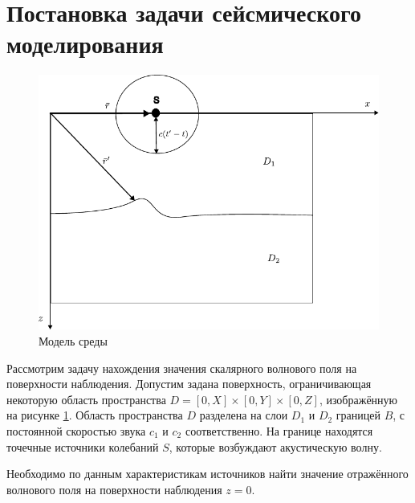 \documentclass[a4paper, fontsize=14pt]{article}
\begin{document}
 
	
	\section{Постановка задачи сейсмического моделирования} 
	\begin{figure}[h]
		
		\centering
		\includegraphics{migration_fig.pdf}
		
		\caption{Модель среды}
		\label{fig:mig}
	\end{figure}
	Рассмотрим задачу нахождения значения скалярного волнового поля на поверхности
	наблюдения.
	Допустим задана поверхность, ограничивающая некоторую область пространства
	$D=[0,X]\times [0,Y]\times [0,Z]$, изображённую на рисунке \ref{fig:mig}.
	Область пространства $D$ разделена на слои $D_1$ и $D_2$ границей $B$, с постоянной
	скоростью звука $c_1$ и $c_2$ соответственно.
	На границе находятся точечные источники колебаний $S$, которые возбуждают
	акустическую волну.
	
	Необходимо по данным характеристикам источников найти значение отражённого волнового поля
	на поверхности наблюдения $z=0$.
	
\end{document}
